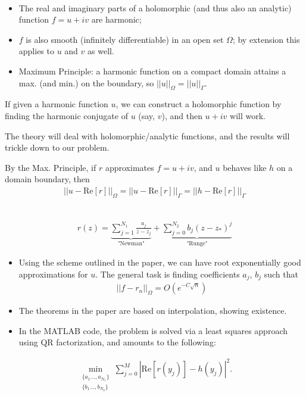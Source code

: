 \documentclass{seminar}
\begin{document}
\begin{slide} %
{} \small \\

\begin{itemize}
	\item The real and imaginary parts of a holomorphic (and thus also an analytic) function $f=u+iv$ are harmonic;
	\item $f$ is also smooth (infinitely differentiable) in an open set $\Omega$; by extension this applies to $u$ and $v$ as well.
	\item Maximum Principle: a harmonic function on a compact domain attains a max. (and min.) on the boundary, so $||u||_{\Omega}=||u||_{\Gamma}$.\\
\end{itemize}

If given a harmonic function $u$, we can construct a holomorphic function by finding the harmonic conjugate of $u$ (say, $v$), and then $u+i v$ will work.

The theory will deal with holomorphic/analytic functions, and the results will trickle down to our problem.

By the Max. Principle, if $r$ approximates $f=u+iv$, and $u$ behaves like $h$ on a domain boundary, then
\begin{align*}
||u-\mathrm{Re}[r]||_{\Omega} = ||u-\mathrm{Re}[r]||_{\Gamma} = ||h-\mathrm{Re}[r]||_{\Gamma}
\end{align*} 
\end{slide} %




\begin{slide} %
{} \small \\
\begin{align*}
r(z) = \underbrace{\sum_{j=1}^{N_1} \frac{a_j}{z-z_j}}_\text{"Newman"} + \underbrace{\sum_{j=0}^{N_2} b_j (z-z_*)^j}_\text{"Runge"}
\end{align*}

\begin{itemize}
	\item Using the scheme outlined in the paper, we can have root exponentially good approximations for $u$. The general task is finding coefficients $a_j$, $b_j$ such that
	\begin{align*}
	||f-r_n||_\Omega = O(e^{-C\sqrt{n}})
	\end{align*}
	\item The theorems in the paper are based on interpolation, showing existence.
	\item In the MATLAB code, the problem is solved via a least squares approach using QR factorization, and amounts to the following:
\end{itemize}
\begin{align*}
\min_{\substack{\{a_1 \ldots ,a_{N_1}\} \\ \{b_1 \ldots ,b_{N_2}\}}} \sum_{j=0}^{M} {| \mathrm{Re} [r(y_j)]-h(y_j) |}^2.
\end{align*}
\end{slide} %
\end{document}
